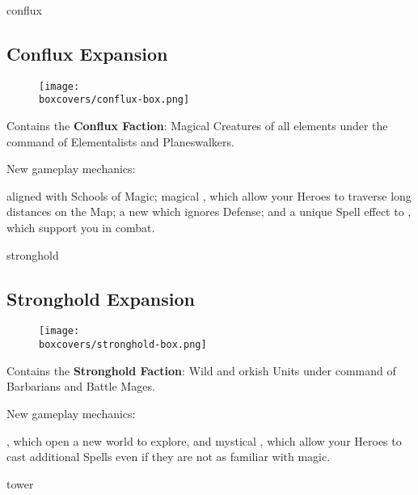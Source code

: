 \begin{multicols}{2}
\begin{expansion}[title=]{conflux}
  \subsection*{\color{conflux}Conflux Expansion}
  \setlength\intextsep{0pt}
  \setlength\columnsep{0.8em}
  \begin{wrapfigure}{l}{0.35\textwidth}
    \texttt{[image: \\boxcovers/conflux-box.png]}
  \end{wrapfigure}
  Contains the \textbf{Conflux Faction}: Magical Creatures of all elements under the command of Elementalists and Planeswalkers.\par
  \medskip
  New gameplay mechanics:\par
  \smallskip
   aligned with Schools of Magic; magical , which allow your Heroes to traverse long distances on the Map; a new  which ignores Defense; and a unique Spell effect to , which support you in combat.  %
\end{expansion}
\vspace*{\fill}

\columnbreak
\begin{expansion}[title=]{stronghold}
  \subsection*{\color{stronghold}Stronghold Expansion}
  \setlength\intextsep{0pt}
  \setlength\columnsep{0.8em}
  \begin{wrapfigure}{l}{0.35\textwidth}
    \texttt{[image: \\boxcovers/stronghold-box.png]}
  \end{wrapfigure}
  Contains the \textbf{Stronghold Faction}: Wild and orkish Units under command of Barbarians and Battle Mages.\par
  \medskip
  New gameplay mechanics:\par
  \smallskip
  , which open a new world to explore, and mystical ,
  which allow your Heroes to cast additional Spells even if they are not as familiar with magic.
\end{expansion}

\vspace*{1em}
\begin{expansion}[title=]{tower}

\end{expansion}
\end{multicols}
